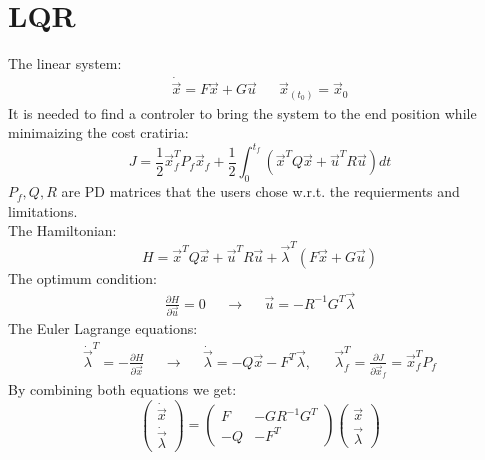 \documentclass[11pt, a4paper]{article}
\begin{document}
\section{LQR}
The linear system:
\begin{equation}
    \begin{matrix}
        \dot{\vec{x}}=F\vec{x}+G\vec{u} && \vec{x}_{\left(t_0\right)}=\vec{x}_0
    \end{matrix}
\end{equation}
It is needed to find a controler to bring the system to the end position while minimaizing the cost cratiria:
\begin{equation}
    J=\frac{1}{2}\vec{x}_f^TP_f\vec{x}_f+\frac{1}{2}\int_0^{t_f}\left(\vec{x}^TQ\vec{x}+\vec{u}^TR\vec{u}\right)dt
\end{equation}
$P_f,Q,R$ are PD matrices that the users chose w.r.t. the requierments and limitations.\\
The Hamiltonian:
\begin{equation}
    H=\vec{x}^TQ\vec{x}+\vec{u}^TR\vec{u}+\vec{\lambda}^T\left(F\vec{x}+G\vec{u}\right)
\end{equation}
The optimum condition:
\begin{equation}
    \begin{matrix}
        \displaystyle\frac{\partial H}{\partial \vec{u}}=0 && \rightarrow && \vec{u}=-R^{-1}G^T\vec{\lambda}
    \end{matrix}
\end{equation}
The Euler Lagrange equations:
\begin{equation}
    \begin{matrix}
        \displaystyle\dot{\vec{\lambda}}^T=-\frac{\partial H}{\partial\vec{x}} && \rightarrow && \dot{\vec{\lambda}}=-Q\vec{x}-F^T\vec{\lambda}, && \displaystyle\vec{\lambda}_f^T=\frac{\partial J}{\partial\vec{x}_f}=\vec{x}_f^TP_f
    \end{matrix}
\end{equation}
By combining both equations we get:
\begin{equation}
    \begin{pmatrix}
        \dot{\vec{x}} \\ \dot{\vec{\lambda}}
    \end{pmatrix}=\begin{pmatrix}
        F & -GR^{-1}G^T \\
        -Q & -F^T
    \end{pmatrix}\begin{pmatrix}
        \vec{x} \\ \vec{\lambda}
    \end{pmatrix}
\end{equation}
\end{document}
